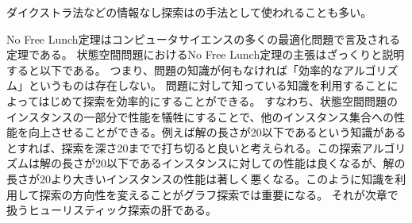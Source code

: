 ダイクストラ法などの情報なし探索はの手法として使われることも多い\cite{tarjan1983data}。

No Free Lunch定理\cite{wolpert1997no}はコンピュータサイエンスの多くの最適化問題で言及される定理である。
状態空間問題におけるNo Free Lunch定理の主張はざっくりと説明すると以下である。
つまり、問題の知識が何もなければ「効率的なアルゴリズム」というものは存在しない。
問題に対して知っている知識を利用することによってはじめて探索を効率的にすることができる。
すなわち、状態空間問題のインスタンスの一部分で性能を犠牲にすることで、他のインスタンス集合への性能を向上させることができる。例えば解の長さが20以下であるという知識があるとすれば、探索を深さ20までで打ち切ると良いと考えられる。この探索アルゴリズムは解の長さが20以下であるインスタンスに対しての性能は良くなるが、解の長さが20より大きいインスタンスの性能は著しく悪くなる。このように知識を利用して探索の方向性を変えることがグラフ探索では重要になる。
それが次章で扱うヒューリスティック探索の肝である。


